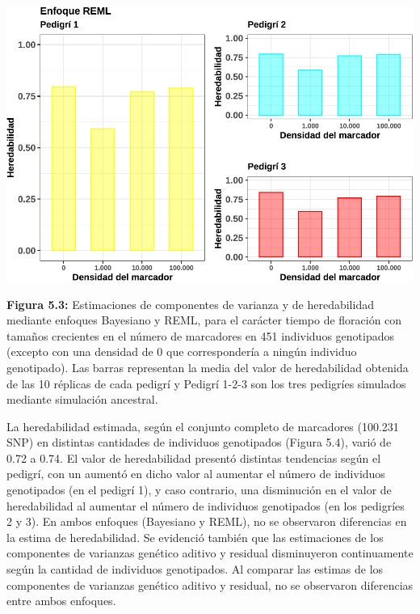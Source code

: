 \documentclass[11pt,spanish,a4paper,oneside,]{book} %
\begin{document}
\begin{center}\includegraphics[width=0.94\linewidth]{figures/param_reml} \end{center}

\noindent
\textbf{Figura 5.3:} Estimaciones de componentes de varianza y de heredabilidad mediante enfoques Bayesiano y REML, para el carácter tiempo de floración con tamaños crecientes en el número de marcadores en 451 individuos genotipados (excepto con una densidad de 0 que correspondería a ningún individuo genotipado). Las barras representan la media del valor de heredabilidad obtenida de las 10 réplicas de cada pedigrí y Pedigrí 1-2-3 son los tres pedigríes simulados mediante simulación ancestral.

La heredabilidad estimada, según el conjunto completo de marcadores (100.231 SNP) en distintas cantidades de individuos genotipados (Figura 5.4), varió de 0.72 a 0.74. El valor de heredabilidad presentó distintas tendencias según el pedigrí, con un aumentó en dicho valor al aumentar el número de individuos genotipados (en el pedigrí 1), y caso contrario, una disminución en el valor de heredabilidad al aumentar el número de individuos genotipados (en los pedigríes 2 y 3). En ambos enfoques (Bayesiano y REML), no se observaron diferencias en la estima de heredabilidad. Se evidenció también que las estimaciones de los componentes de varianzas genético aditivo y residual disminuyeron continuamente según la cantidad de individuos genotipados. Al comparar las estimas de los componentes de varianzas genético aditivo y residual, no se observaron diferencias entre ambos enfoques.

\newpage
\end{document}
